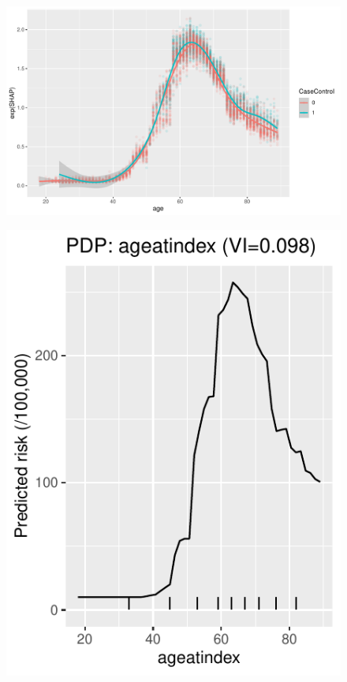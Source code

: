 \documentclass[12pt]{article}
\begin{document}
\begin{figure}[h]
\centering
\includegraphics[width=\textwidth]{figures/shap_age.pdf}
\end{figure}

\begin{figure}[h]
\centering
\includegraphics[width=\textwidth]{figures/pdp/ageatindex.pdf}
\end{figure}
\end{document}
